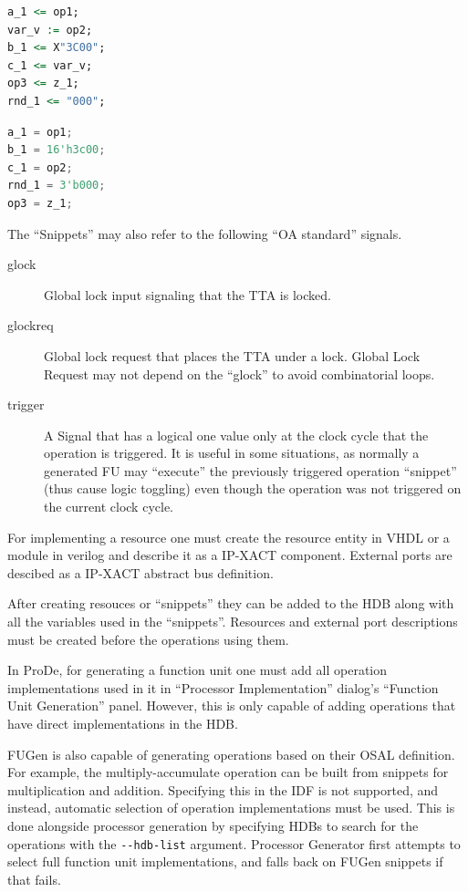 \documentclass[a4paper,twoside]{tceusermanual}
\begin{document}
\begin{lstlisting}[language=VHDL,caption={VHDL ``snippet'' for ADDH operation}]
a_1 <= op1;
var_v := op2;
b_1 <= X"3C00";
c_1 <= var_v;
op3 <= z_1;
rnd_1 <= "000";
\end{lstlisting}

\begin{lstlisting}[language=Verilog,caption={Verilog ``snippet'' for ADDH operation}]
a_1 = op1;
b_1 = 16'h3c00;
c_1 = op2;
rnd_1 = 3'b000;
op3 = z_1;
\end{lstlisting}


The ``Snippets'' may also refer to the following ``OA standard'' signals.

\begin{description}
\item[glock] Global lock input signaling that the TTA is locked.
\item[glockreq] Global lock request that places the TTA under a
  lock. Global Lock Request may not depend on the ``glock'' to avoid
  combinatorial loops.
\item[trigger] A Signal that has a logical one value only at the clock cycle that
  the operation is triggered. It is useful in some situations, as normally a
  generated FU may ``execute'' the previously triggered operation
  ``snippet'' (thus cause logic toggling) even though the operation was
  not triggered on the current clock cycle.
\end{description}

For implementing a resource one must create the resource entity in
VHDL or a module in verilog and describe it as a IP-XACT component.
External ports are descibed as a IP-XACT abstract bus definition.

After creating resouces or ``snippets'' they can be added to the HDB
along with all the variables used in the ``snippets''. Resources and
external port descriptions must be created before the operations using
them.

In ProDe, for generating a function unit one must add all operation
implementations used in it in ``Processor Implementation'' dialog's
``Function Unit Generation'' panel. However, this is only capable of
adding operations that have direct implementations in the HDB.

FUGen is also capable of generating operations based on their OSAL definition.
For example, the multiply-accumulate operation can be built from snippets for
multiplication and addition. Specifying this in the IDF is not supported, and
instead, automatic selection of operation implementations must be used. This is
done alongside processor generation by specifying HDBs to search for the
operations with the \verb|--hdb-list| argument. Processor Generator first
attempts to select full function unit implementations, and falls back on FUGen
snippets if that fails.
\end{document}
